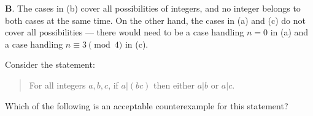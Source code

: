 \documentclass[addpoints]{exam}
\begin{document}
\begin{questions}
	
	\begin{solution}
		\textbf{B}. The cases in (b) cover all possibilities of integers, and no integer belongs to both cases at the same time. On the other hand, the cases in (a) and (c) do not cover all possibilities --- there would need to be a case handling $n=0$ in (a) and a case handling $n \equiv 3 \pmod 4$ in (c). 
	\end{solution}
	
	
\question[2] Consider the statement: 
\begin{quote}
	For all integers $a,b,c$, if $a | (bc)$ then either $a | b$ or $a | c$. 
\end{quote}
Which of the following is an acceptable counterexample for this statement? 


\end{questions}
\end{document}
